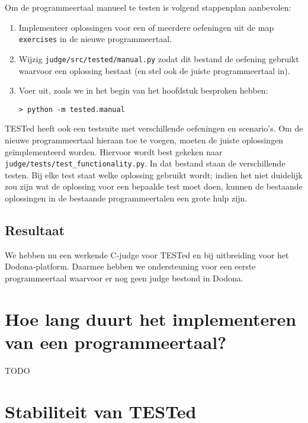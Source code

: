 \inputminted[firstline=17,lastline=23]{python}{sources/languages-init.py}

Om de programmeertaal manueel te testen is volgend stappenplan aanbevolen:

\begin{enumerate}
    \item Implementeer oplossingen voor een of meerdere oefeningen uit de map \texttt{exercises} in de nieuwe programmeertaal.
    \item Wijzig \texttt{judge/src/tested/manual.py} zodat dit bestand de oefening gebruikt waarvoor een oplossing bestaat (en stel ook de juiste programmeertaal in).
    \item Voer uit, zoals we in het begin van het hoofdstuk besproken hebben:
    
    \begin{verbatim}
> python -m tested.manual
    \end{verbatim}
\end{enumerate}

TESTed heeft ook een testsuite met verschillende oefeningen en scenario's.
Om de nieuwe programmeertaal hieraan toe te voegen, moeten de juiste oplossingen geïmplementeerd worden.
Hiervoor wordt best gekeken naar \texttt{judge/tests/test\_functionality.py}.
In dat bestand staan de verschillende testen.
Bij elke test staat welke oplossing gebruikt wordt;
indien het niet duidelijk zou zijn wat de oplossing voor een bepaalde test moet doen, kunnen de bestaande oplossingen in de bestaande programmeertalen een grote hulp zijn.

\subsection{Resultaat}\label{subsec:resultaat}

We hebben nu een werkende C-judge voor TESTed en bij uitbreiding voor het Dodona-platform.
Daarmee hebben we ondersteuning voor een eerste programmeertaal waarvoor er nog geen judge bestond in Dodona.


\section{Hoe lang duurt het implementeren van een programmeertaal?}\label{sec:hoe-lang-duurt-het-implementeren-van-een-programmeertaal?}

TODO

\section{Stabiliteit van TESTed}\label{sec:stabiliteit-van-tested}


